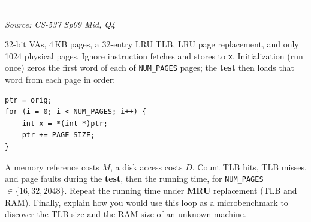 \documentclass[11pt,a4paper]{article}
\makeatletter
\newcommand{\keepspace}[1]{\par\penalty-100\begingroup
  \setlength{\dimen@}{#1}\dimen@ii\pagegoal\advance\dimen@ii-\pagetotal
  \ifdim\dimen@>\dimen@ii\ifdim\dimen@ii>\z@\vfil\fi\break\fi\endgroup}
\newcounter{qn}[section]
\newenvironment{Qn}[4]{%
  \refstepcounter{qn}\keepspace{7\baselineskip}%
  \begin{tcolorbox}[qboxstyle, title={Q\thesection.\theqn\ \ [#1 \textbar\ #2]\ \ #4}]%
  {\footnotesize\color{g3}\textit{Source: #3}}\par\smallskip%
}{%
  \end{tcolorbox}%
}
\makeatother
\begin{document}
\begin{Qn}{Hard}{Lect 15}{CS-537 Sp09 Mid, Q4}{TLB hits, misses, and page faults under LRU vs MRU, and the resulting EAT}
32-bit VAs, 4\,KB pages, a 32-entry LRU TLB, LRU page replacement, and
only 1024 physical pages. Ignore instruction fetches and stores to
\texttt{x}. Initialization (run once) zeros the first word of each of
\texttt{NUM\_PAGES} pages; the \textbf{test} then loads that word from
each page in order:
\begin{lstlisting}[numbers=none]
ptr = orig;
for (i = 0; i < NUM_PAGES; i++) {
    int x = *(int *)ptr;
    ptr += PAGE_SIZE;
}
\end{lstlisting}
A memory reference costs $M$, a disk access costs $D$. Count TLB hits,
TLB misses, and page faults during the \textbf{test}, then the running
time, for \texttt{NUM\_PAGES} $\in \{16,32,2048\}$. Repeat the running
time under \textbf{MRU} replacement (TLB and RAM). Finally, explain how
you would use this loop as a microbenchmark to discover the TLB size
and the RAM size of an unknown machine.
\end{Qn}
\end{document}
